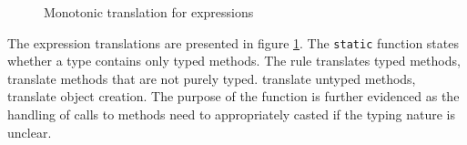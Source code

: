 \documentclass[a4paper,USenglish]{tex/lipics-v2016}
\begin{document}
\begin{figure}[!ht]
\begin{mathpar}




\end{mathpar}
\caption{Monotonic translation for expressions}
\label{fig:mono-trans2}
\end{figure}

The expression translations are presented in figure \ref{fig:mono-trans2}. 
The \texttt{static} function states whether a type contains only typed methods.
The rule  translates typed methods,  translate methods that are not purely typed.
 translate untyped methods,  translate object creation.
The purpose of the  function is further evidenced as the 
handling of calls to methods need to appropriately casted if the typing nature is unclear.
\end{document}
